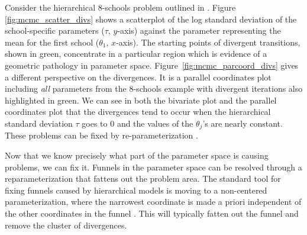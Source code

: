 \documentclass{statsoc}
\begin{document}
Consider the hierarchical 8-schools
problem outlined in \citep{rubin1981, gelman2013bda}. Figure \ref{fig:mcmc_scatter_divs}
shows a scatterplot of the log standard deviation of the school-specific
parameters ($\tau$, $y$-axis) against the parameter representing the mean for
the first school ($\theta_1$, $x$-axis). The starting points of divergent
transitions, shown in green, concentrate in a particular region which is
evidence of a geometric pathology in parameter space. Figure~\ref{fig:mcmc_parcoord_divs}
gives a different perspective on the divergences. It is a parallel coordinates
plot including \emph{all} parameters from the 8-schools example with divergent
iterations also highlighted in green. We can see in both the bivariate plot and
the parallel coordinates plot that the divergences tend to occur when the
hierarchical standard deviation $\tau$ goes to 0 and the values of the
$\theta_j$'s are nearly constant. These problems can be fixed by 
re-parameterization \citep{betancourt2015}.

Now that we know precisely what part of the parameter space is causing problems,
we can fix it. Funnels in the parameter space can be resolved through a
reparameterization that fattens out the problem area. The standard tool for
fixing funnels caused by hierarchical models is moving to a non-centered
parameterization, where the narrowest coordinate is made a priori independent of
the other coordinates in the funnel \citep{betancourt2015}. This will typically
fatten out the funnel and remove the cluster of divergences.
\end{document}
